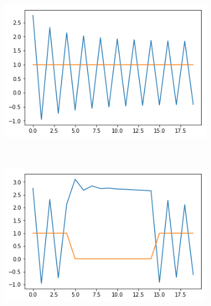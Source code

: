 \documentclass[12pt, letterpaper]{article}
\begin{document}
\begin{figure}[h]
    \centering
    \begin{subfigure}[b]{0.3\textwidth}
        \includegraphics[width=\textwidth]{fo1}
        \label{fig:gull}
    \end{subfigure}
    ~ %
    \begin{subfigure}[b]{0.3\textwidth}
        \includegraphics[width=\textwidth]{fo2}
        \label{fig:tiger}
    \end{subfigure}
    ~ %
    \begin{subfigure}[b]{0.3\textwidth}

\end{subfigure}
\end{figure}
\end{document}
